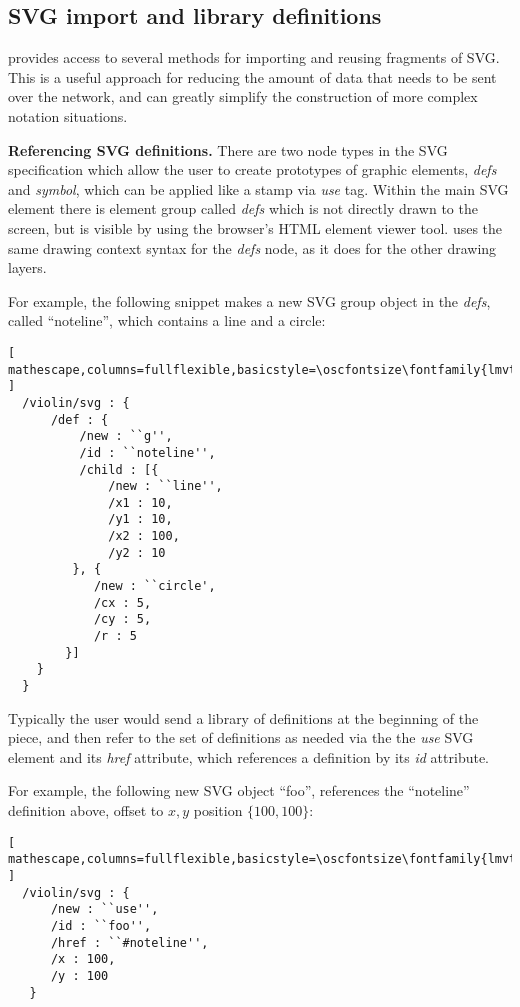 \subsection{SVG import and library definitions}\label{sec:defs}
\drawsocket provides access to several methods for importing and reusing fragments of SVG.
This is a useful approach for reducing the amount of data that needs to be sent over the network, and can greatly simplify the construction of more complex notation situations.

\medskip
\noindent
\textbf{Referencing SVG definitions.} 
There are two node types in the SVG specification which allow the user to create prototypes of graphic elements, \textit{defs} and \textit{symbol}, which can be applied like a stamp via \textit{use} tag. Within the main SVG element there is element group called \textit{defs} which is not directly drawn to the screen, but is visible by using the browser's HTML element viewer tool.
\drawsocket uses the same drawing context syntax for the \textit{defs} node, as it does for the other drawing layers.

For example, the following snippet makes a new SVG group object in the \textit{defs}, called ``noteline'', which contains a line and a circle:

\begin{lstlisting}[ mathescape,columns=fullflexible,basicstyle=\oscfontsize\fontfamily{lmvtt}\selectfont ]
  /violin/svg : {
      /def : {
          /new : ``g'',
          /id : ``noteline'',
          /child : [{
              /new : ``line'',
              /x1 : 10,
              /y1 : 10,
              /x2 : 100,
              /y2 : 10
         }, {
            /new : ``circle',
            /cx : 5,
            /cy : 5,
            /r : 5
        }]
    } 
  }
 \end{lstlisting}

Typically the user would send a library of definitions at the beginning of the piece, and then refer to the set of definitions as needed via the the \textit{use} SVG element and its \textit{href} attribute, which references a definition by its \textit{id} attribute.

For example, the following new SVG object ``foo'', references the ``noteline'' definition above, offset to ${x,y}$ position $\{100,100\}$:

\begin{lstlisting}[ mathescape,columns=fullflexible,basicstyle=\oscfontsize\fontfamily{lmvtt}\selectfont ]
  /violin/svg : {
      /new : ``use'',
      /id : ``foo'',
      /href : ``#noteline'',
      /x : 100,
      /y : 100
   }
 \end{lstlisting}

